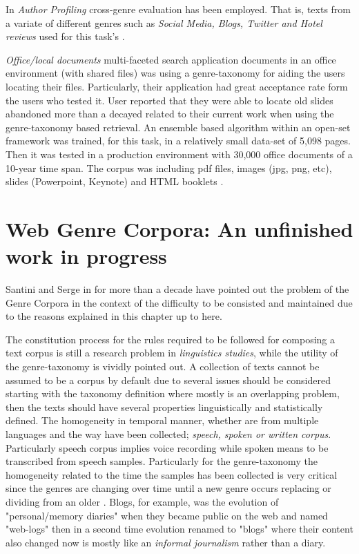 In \textit{Author Profiling} cross-genre evaluation has been employed. That is, texts from a variate of different genres such as \textit{Social Media, Blogs, Twitter and Hotel reviews} used for this task's  \parencite{rangel2016overview}. 

\textit{Office/local documents} multi-faceted search application documents in an office environment (with shared files) was using a genre-taxonomy for aiding the users locating their files. Particularly, their application had great acceptance rate form the users who tested it.  User reported that they were able to locate old slides abandoned more than a decayed related to their current work when using the genre-taxonomy based retrieval. An ensemble based algorithm within an open-set framework was trained, for this task, in a relatively small data-set of 5,098 pages. Then it was tested in a production environment with 30,000 office documents of a 10-year time span. The corpus was including pdf files, images (jpg, png, etc), slides (Powerpoint, Keynote) and HTML booklets \parencite{chen2012genre}.

\section{Web Genre Corpora: An unfinished work in progress}\label{chap:relevant_work:sec:intro}

Santini and Serge in \parencite{santini2009web} for more than a decade have pointed out the problem of the Genre Corpora in the context of the difficulty to be consisted and maintained due to the reasons explained in this chapter up to here. 

The constitution process for the rules required to be followed for composing a text corpus is still a research problem in \textit{linguistics studies}, while the utility of the genre-taxonomy is vividly pointed out. A collection of texts cannot be assumed to be a corpus by default due to several issues should be considered starting with the taxonomy definition where mostly is an overlapping problem, then the texts should have several properties linguistically and statistically defined. The homogeneity in temporal manner, whether are from multiple languages and the way have been collected; \textit{speech, spoken or written corpus}. Particularly speech corpus implies voice recording while spoken means to be transcribed from speech samples. Particularly for the genre-taxonomy the homogeneity related to the time the samples has been collected is very critical since the genres are changing over time until a new genre occurs replacing or dividing from an older \parencite{dash2018history}. Blogs, for example, was the evolution of "personal/memory diaries" when they became public on the web and named "web-logs" then in a second time evolution renamed to "blogs" where their content also changed now is mostly like an \textit{informal journalism} rather than a diary.

